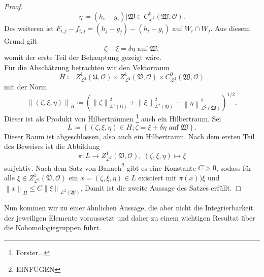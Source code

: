\documentclass[11pt,a4paper]{scrartcl}
\theoremstyle{thm}
\theoremstyle{def}
\theoremstyle{remark}
\newcommand{\norm}[1]{\left\lVert#1\right\rVert}
\begin{document}
\begin{proof}
\[
\eta\coloneqq (h_i-g_i)|\mathfrak{W}\in C^0_{\mathcal{L}^2}(\mathfrak{W},\mathcal{O}).
\]
Des weiteren ist $F_{i,j}-f_{i,j}=(h_j-g_j)-(h_i-g_i)$ auf $W_i\cap W_j$. Aus diesem Grund gilt
\[
\zeta-\xi=\delta\eta\text{ auf }\mathfrak{W},
\]
womit der erste Teil der Behauptung gezeigt wäre.\\
Für die Abschätzung betrachten wir den Vektorraum 
\[
H\coloneqq Z^1_{\mathcal{L}^2}(\mathfrak{U},\mathcal{O})\times Z^1_{\mathcal{L}^2}(\mathfrak{V},\mathcal{O})\times C^0_{\mathcal{L}^2}(\mathfrak{W},\mathcal{O})
\]
mit der Norm
\[
\norm{(\zeta,\xi,\eta)}_{H}\coloneqq \left( \norm{\zeta}_{\mathcal{L}^2(\mathfrak{U})}^2+\norm{\xi}_{\mathcal{L}^2(\mathfrak{V})}^2+\norm{\eta}_{\mathcal{L}^2(\mathfrak{W})}^2\right)^{1/2}.
\]
Dieser ist als Produkt von Hilberträumen \footnote{Forster...} auch ein Hilbertraum. Sei 
\[
L\coloneqq\left\{ (\zeta,\xi,\eta)\in H; \zeta=\xi+\delta\eta\text{ auf } \mathfrak{W}\right\}.
\]
Dieser Raum ist abgeschlossen, also auch ein Hilbertraum. Nach dem ersten Teil des Beweises ist die Abbildung
\[
\pi:L\rightarrow Z^1_{\mathcal{L}^2}(\mathfrak{V},\mathcal{O}),~(\zeta,\xi,\eta)\mapsto \xi
\]
surjektiv. 
Nach dem Satz von Banach\footnote{EINFÜGEN} gibt es eine Konstante $C>0$, sodass für alle $\xi\in Z^1_{\mathcal{L}^2}(\mathfrak{V},\mathcal{O})$ ein $x=(\zeta,\xi,\eta)\in L$ existiert mit $\pi(x))\xi$ und $\norm{x}_H\leq C\norm{\xi}_{\mathcal{L}^2(\mathfrak{W})}$.
Damit ist die zweite Aussage des Satzes erfüllt.
\end{proof}
Nun kommen wir zu einer ähnlichen Aussage, die aber nicht die Integrierbarkeit der jeweiligen Elemente voraussetzt und daher zu einem wichtigen Resultat über die Kohomologiegruppen führt.
\end{document}
